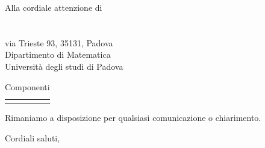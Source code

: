 \documentclass[a4paper]{letter}
\begin{document}
\begin{letter} {Alla cordiale attenzione di \\ \TV \\ \RC \\ via Trieste 93, 35131, Padova\\ Dipartimento di Matematica \\ Università degli studi di Padova }
\begin{longtable}{
			>{\centering}p{}
			>{\centering}p{}
			>{\centering\arraybackslash}p{} }
			\rowcolor{white}\caption {Componenti} \\

		\end{longtable}
	Rimaniamo a disposizione per qualsiasi comunicazione o chiarimento.\\

\closing{
  Cordiali saluti,
}

\end{letter}
\end{document}
